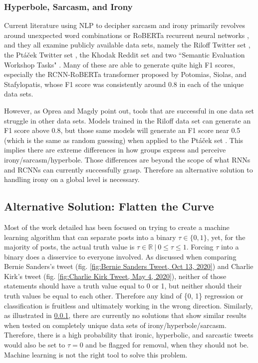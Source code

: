 \documentclass[preprint,review,12pt]{elsarticle}
\begin{document}
\subsubsection{Hyperbole, Sarcasm, and Irony}
\label{hyperbole}
Current literature using NLP to decipher sarcasm and irony primarily revolves around unexpected word combinations \cite{barbieri2014modelling,buschmeier2014impact,ghosh2015sarcastic} or RoBERTa recurrent neural networks \cite{potamias2020transformer}, and they all examine publicly available data sets, namely the Riloff Twitter set \cite{riloff2013sarcasm}, the Pt{\'a}{\v{c}}ek Twitter set \cite{ptavcek2014sarcasm}, the Khodak Reddit set \cite{khodak2017large} and two ``Semantic Evaluation Workshop Tasks" \cite{van2018semeval,ghosh2015semeval}. Many of these are able to generate quite high F1 scores, especially the RCNN-RoBERTa transformer proposed by Potomias, Siolas, and Stafylopatis, whose F1 score was consistently around 0.8 in each of the unique data sets. 

However, as Oprea and Magdy point out, tools that are successful in one data set struggle in other data sets. Models trained in the Riloff data set can generate an F1 score above 0.8, but those same models will generate an F1 score near 0.5 (which is the same as random guessing) when applied to the Pt{\'a}{\v{c}}ek set \cite{oprea2019exploring}. This implies there are extreme differences in how groups express and perceive irony/sarcasm/hyperbole. Those differences are beyond the scope of what RNNs and RCNNs can currently successfully grasp. Therefore an alternative solution to handling irony on a global level is necessary. 
 
\subsection{Alternative Solution: Flatten the Curve}
\label{Flatten the Curve Section}
 Most of the work detailed has been focused on trying to create a machine learning algorithm that can separate posts into a binary $\tau \in \{0,1\}$, yet, for the majority of posts, the actual truth value is $\tau \in \mathbb{R} \ | \ 0 \leq \tau \leq 1$. Forcing $\tau$ into a binary does a disservice to everyone involved. As discussed when comparing Bernie Sanders's tweet (fig. \ref{fig:Bernie Sanders Tweet, Oct 13, 2020}) and  Charlie Kirk's tweet (fig. \ref{fig:Charlie Kirk Tweet, May 4, 2020}), neither of those statements should have a truth value equal to 0 or 1, but neither should their truth values be equal to each other. Therefore any kind of \{0, 1\} regression or classification is fruitless and ultimately working in the wrong direction. Similarly, as illustrated in \ref{hyperbole}, there are currently no solutions that show similar results when tested on completely unique data sets of irony/hyperbole/sarcasm. Therefore, there is a high probability that ironic, hyperbolic, and sarcastic tweets would also be set to $\tau = 0$ and be flagged for removal, when they should not be. Machine learning is not the right tool to solve this problem. 
 
\end{document}
